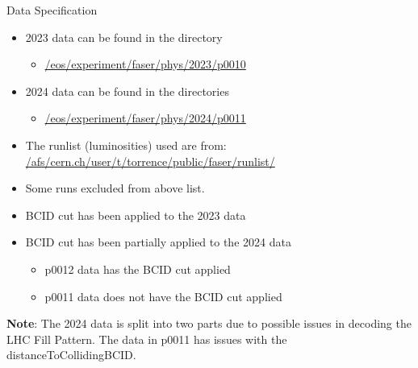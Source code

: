 \begin{frame}{Data Specification}
    \begin{itemize}
        \item 2023 data can be found in the directory
        \begin{itemize}
            \item \href{/eos/experiment/faser/phys/2023/p0010}{/eos/experiment/faser/phys/2023/p0010}
        \end{itemize}
        \item 2024 data can be found in the directories
        \begin{itemize}
            \item \href{/eos/experiment/faser/phys/2024/p0011, p0012}{/eos/experiment/faser/phys/2024/p0011}
        \end{itemize}
        \item The runlist (luminosities) used are from:
        \href{/afs/cern.ch/user/t/torrence/public/faser/runlist/2024/faser runlist 2024 stable.csv}{/afs/cern.ch/user/t/torrence/public/faser/runlist/}
        \item Some runs excluded from above list.
        \item BCID cut has been applied to the  2023 data
        \item BCID cut has been partially applied to the 2024 data
        \begin{itemize}
            \item p0012 data has the BCID cut applied
            \item p0011 data does not have the BCID cut applied
        \end{itemize}
    \end{itemize}
    
    {\scriptsize \textbf{Note}: The 2024 data is split into two parts due to possible issues in decoding the LHC Fill Pattern. The data in p0011 has issues with the distanceToCollidingBCID.}
\end{frame}

